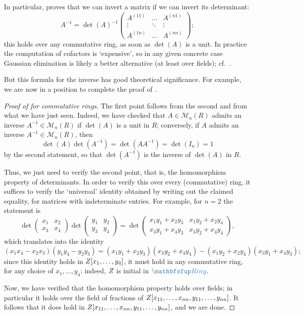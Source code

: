 In particular,  proves that we can invert a matrix if
we can invert its determinant:
\[
  A^{-1} = \det(A)^{-1}
  \begin{pmatrix}
    A^{(11)} & \dots & A^{(n1)} \\
    \vdots & \ddots & \vdots \\
    A^{(1n)} & \dots & A^{(nn)}
  \end{pmatrix};
\]
this holds over any commutative ring, as soon as $\det(A)$ is a unit.
In practice the computation of cofactors is `expensive', so in any
given concrete case Gaussian elimination is likely a better
alternative (at least over fields); cf.\
.

But this formula for the inverse has good theoretical
significance. For example, we are now in a position to complete the
proof of .
\begin{proof}[Proof of  for commutative rings]
  The first point follows from the second and from what we have just
  seen. Indeed, we have checked that $A \in \mathcal{M}_n(R)$ admits
  an inverse $A^{-1} \in \mathcal{M}_n(R)$ if $\det(A)$ is a unit in
  $R$; conversely, if $A$ admits an inverse
  $A^{-1} \in \mathcal{M}_n(R)$, then
  \[
    \det(A) \det(A^{-1}) = \det(AA^{-1}) = \det(I_n) = 1
  \]
  by the second statement, so that $\det(A^{-1})$ is the inverse of
  $\det(A)$ in $R$.

  Thus, we just need to verify the second point, that is, the
  homomorphism property of determinants. In order to verify this over
  every (commutative) ring, it suffices to verify the `universal'
  identity obtained by writing out the claimed equality, for matrices
  with indeterminate entries. For example, for $n = 2$ the statement
  is
  \[
    \det \begin{pmatrix} x_1 & x_2 \\ x_3 & x_4 \end{pmatrix}
    \det \begin{pmatrix} y_1 & y_2 \\ y_3 & y_4 \end{pmatrix} = \det
    \begin{pmatrix}
      x_1y_1 + x_2y_3 & x_1y_2 + x_2y_4 \\
      x_3y_1 + x_4y_3 & x_3y_2 + x_4y_4
    \end{pmatrix},
  \]
  which translates into the identity
  \[
    (x_1x_4 - x_2x_3)(y_1y_4 - y_2y_3) = (x_1y_1 + x_2y_3)(x_3y_2 +
    x_4y_4) - (x_1y_2 + x_2y_4)(x_3y_1 + x_4y_3);
  \]
  since this identity holds in $Z[x_1, \dots, y_4]$, it must hold in
  any commutative ring, for any choice of $x_1, \dots, y_4$: indeed,
  $Z$ is initial in $\categ{Ring}$.

  Now, we have verified that the homomorphism property holds over
  fields; in particular it holds over the field of fractions of
  $Z[x_{11}, \dots, x_{nn}, y_{11}, \dots, y_{nn}]$. It follows that
  it does hold in $Z[x_{11}, \dots, x_{nn}, y_{11}, \dots, y_{nn}]$,
  and we are done.
\end{proof}

